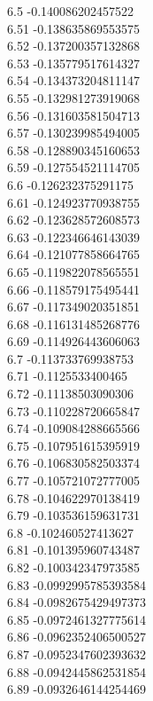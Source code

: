 {6.5	-0.140086202457522\\
6.51	-0.138635869553575\\
6.52	-0.137200357132868\\
6.53	-0.135779517614327\\
6.54	-0.134373204811147\\
6.55	-0.132981273919068\\
6.56	-0.131603581504713\\
6.57	-0.130239985494005\\
6.58	-0.128890345160653\\
6.59	-0.127554521114705\\
6.6	-0.126232375291175\\
6.61	-0.124923770938755\\
6.62	-0.123628572608573\\
6.63	-0.122346646143039\\
6.64	-0.121077858664765\\
6.65	-0.119822078565551\\
6.66	-0.118579175495441\\
6.67	-0.117349020351851\\
6.68	-0.116131485268776\\
6.69	-0.114926443606063\\
6.7	-0.113733769938753\\
6.71	-0.1125533400465\\
6.72	-0.11138503090306\\
6.73	-0.110228720665847\\
6.74	-0.109084288665566\\
6.75	-0.107951615395919\\
6.76	-0.106830582503374\\
6.77	-0.105721072777005\\
6.78	-0.104622970138419\\
6.79	-0.103536159631731\\
6.8	-0.102460527413627\\
6.81	-0.101395960743487\\
6.82	-0.100342347973585\\
6.83	-0.0992995785393584\\
6.84	-0.0982675429497373\\
6.85	-0.0972461327775614\\
6.86	-0.0962352406500527\\
6.87	-0.0952347602393632\\
6.88	-0.0942445862531854\\
6.89	-0.0932646144254469\\
}
